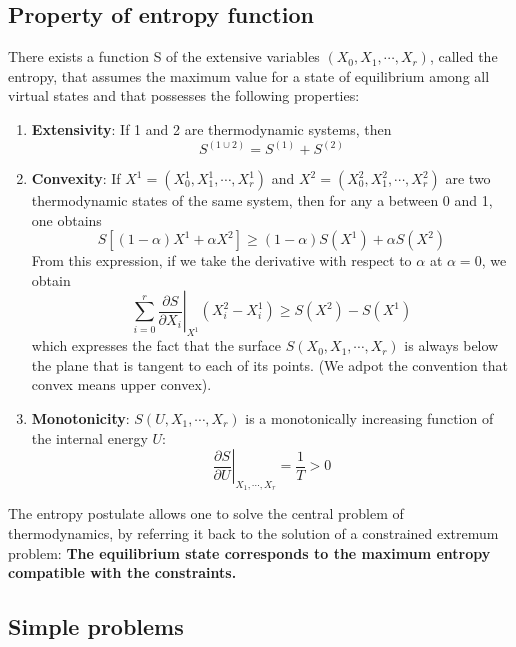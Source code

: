 \subsection{Property of entropy function}
There exists a function S of the extensive variables $(X_0, X_1, \cdots, X_r)$, called the entropy, that assumes the maximum value for a state of equilibrium among all virtual states and that possesses the following properties:
\begin{enumerate}
\item \textbf{Extensivity}: If 1 and 2 are thermodynamic systems, then 
\[ S^{(1 \cup 2)} = S^{(1)} + S^{(2)} \]
\item \textbf{Convexity}: If $ X^1 = (X_0^1, X_1^1, \cdots, X_r^1)$ and $X^2 = (X_0^2, X_1^2, \cdots, X_r^2)$ are two thermodynamic states of the same system, then for any a between 0 and 1, one obtains
\[ S[(1-\alpha)X^1 + \alpha X^2] \geq (1 - \alpha)S(X^1) + \alpha S(X^2) \]
From this expression, if we take the derivative with respect to $\alpha$ at $\alpha = 0$, we obtain
\[\left. \sum_{i=0}^{r} \frac{\partial S}{\partial X_i} \right|_{X^1} (X_i^2 - X_i^1) \geq S(X^2) - S(X^1) \]
which expresses the fact that the surface $S(X_0, X_1, \cdots, X_r)$ is always below the plane that
is tangent to each of its points. (We adpot the convention that convex means upper convex).
\item \textbf{Monotonicity}: $S(U, X_1, \cdots, X_r)$ is a monotonically increasing function of the internal energy $U$:
\[\left. \frac{\partial S}{\partial U} \right|_{X_1,\cdots,X_r} = \frac{1}{T} > 0\]
\end{enumerate}
The entropy postulate allows one to solve the central problem of thermodynamics, by referring it back to the solution of a constrained extremum problem:
\textbf{The equilibrium state corresponds to the maximum entropy compatible with the constraints.}

\subsection{Simple problems}
